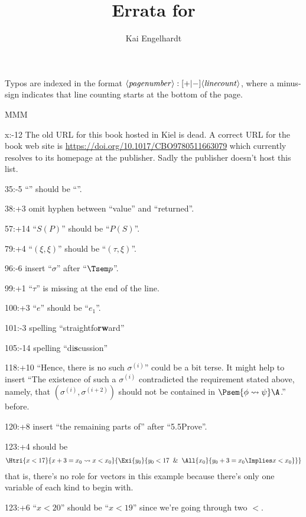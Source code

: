 \documentclass[11pt,smallheadings,parskip]{scrartcl}
\title{Errata for \citep{EdR:cup98}}
\author{Kai Engelhardt}
\begin{document}
\maketitle
Typos are indexed in the format
$\langle\text{\textit{pagenumber}}\rangle:[+|-]\langle\text{\textit{linecount}}\rangle$,
where a minus-sign indicates that line counting starts at the bottom
of the page.

\begin{deflist}{MMM}
\item[x:-12] The old URL for this book hosted in Kiel is dead. A correct URL for the book web site is \url{https://doi.org/10.1017/CBO9780511663079} which currently resolves to its homepage at the publisher. Sadly the publisher doesn't host this list.
\item[35:-5] ``'' should be ``\cons''.
\item[38:+3] omit hyphen between ``value'' and ``returned''.
\item[57:+14] ``$S(P)$'' should be ``$P(S)$''.
\item[79:+4] ``$(\xi,\xi)$'' should be ``$(\tau,\xi)$''.
\item[96:-6] insert ``$\sigma$'' after ``$\Tsem p$''.
\item[99:+1] ``$\tau$'' is missing at the end of the line.
\item[100:+3] ``$e$'' should be ``$e_1$''.
\item[101:-3] spelling ``straightfo\textbf{rw}ard''
\item[105:-14] spelling ``di\textbf{s}cussion''
\item[118:+10]  ``Hence, there is no such $\sigma^{(i)}$'' could be a bit terse. It might help to insert ``The existence of such a $\sigma^{(i)}$ contradicted the requirement stated above, namely, that $(\sigma^{(i)},\sigma^{(i+2)})$ should not be contained in $\Psem{\phi\leadsto\psi}\A$.'' before.
\item[120:+8] insert ``the remaining parts of'' after ``5.5\quad Prove''.
\item[123:+4] should be
  \begin{gather*}
    \Htri{x<17}{x+3=x_0 \leadsto x<x_0}{%
      \Exi{y_0}{%
        y_0<17 \And \All{x_0}{%
          y_0+3=x_0 \Implies x<x_0}}}
  \end{gather*}
  that is, there's no role for vectors in this example because there's
  only one variable of each kind to begin with.
\item[123:+6] ``$x<20$'' should be ``$x<19$'' since we're going through two $<$.



\end{deflist}
\end{document}
